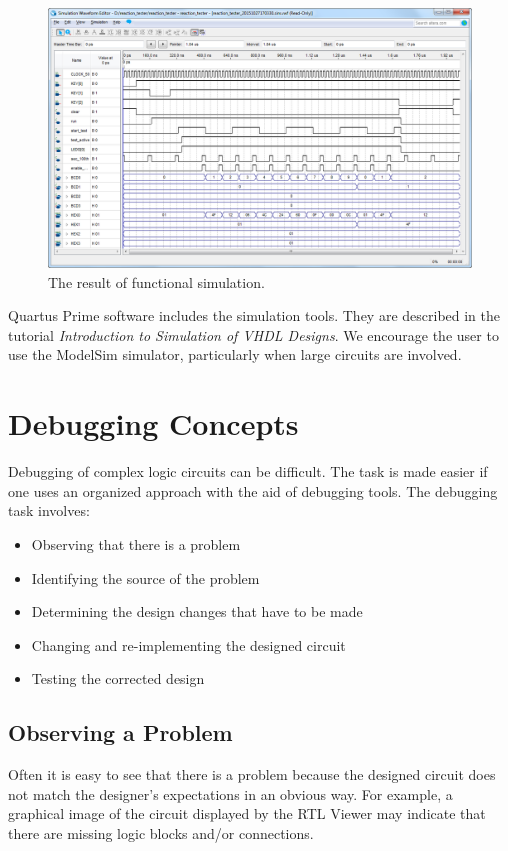 \documentclass[11pt, twoside, pdftex]{article}
\begin{document}
\begin{figure}[H]
   \begin{center}
      \includegraphics[scale=0.5]{figures/figure20.png}
   \caption{The result of functional simulation.} 
	 \label{fig:20}
	 \end{center}
\end{figure}

Quartus Prime software includes the simulation tools. They are described in
the tutorial {\it Introduction to Simulation of VHDL Designs}.
We encourage the user to use the ModelSim simulator, particularly when large
circuits are involved.

\section{Debugging Concepts}
Debugging of complex logic circuits can be difficult. The task is made easier
if one uses an organized approach with the aid of debugging tools.
The debugging task involves:
\begin{itemize}
\item Observing that there is a problem
\item Identifying the source of the problem
\item Determining the design changes that have to be made
\item Changing and re-implementing the designed circuit 
\item Testing the corrected design
\end{itemize}

\subsection{Observing a Problem}
Often it is easy to see that there is a problem because the designed circuit
does not match the designer's expectations in an obvious way.
For example, a graphical image of the circuit displayed by the RTL Viewer
may indicate that there are missing logic blocks and/or connections.
\end{document}
